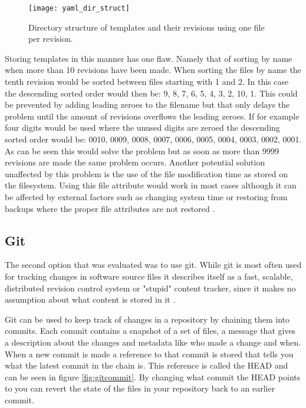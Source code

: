 \begin{figure}[h!]
	\centering
	\texttt{[image: yaml\_dir\_struct]}
	\caption{Directory structure of templates and their revisions using one file per revision.}
	\label{fig:diskstruct}
\end{figure}

Storing templates in this manner has one flaw.
Namely that of sorting by name when more than 10 revisions have been made.
When sorting the files by name the tenth revision would be sorted between files starting with 1 and 2.
In this case the descending sorted order would then be: 9, 8, 7, 6, 5, 4, 3, 2, 10, 1.
This could be prevented by adding leading zeroes to the filename but that only delays the problem until the amount of revisions overflows the leading zeroes.
If for example four digits would be used where the unused digits are zeroed the descending sorted order would be: 0010, 0009, 0008, 0007, 0006, 0005, 0004, 0003, 0002, 0001.
As can be seen this would solve the problem but as soon as more than 9999 revisions are made the same problem occurs.
Another potential solution unaffected by this problem is the use of the file modification time as stored on the filesystem.
Using this file attribute would work in most cases although it can be affected by external factors such as changing system time or restoring from backups where the proper file attributes are not restored \cite{noauthor_mtime_nodate}.

\subsection{Git}
The second option that was evaluated was to use git.
While git is most often used for tracking changes in software source files it describes itself as a fast, scalable, distributed revision control system or "stupid" content tracker, since it makes no assumption about what content is stored in it \cite{truyers_git_2016}.

Git can be used to keep track of changes in a repository by chaining them into commits.
Each commit contains a snapshot of a set of files, a message that gives a description about the changes and metadata like who made a change and when.
When a new commit is made a reference to that commit is stored that tells you what the latest commit in the chain is.
This reference is called the HEAD and can be seen in figure \ref{fig:gitcommit}.
By changing what commit the HEAD points to you can revert the state of the files in your repository back to an earlier commit.

